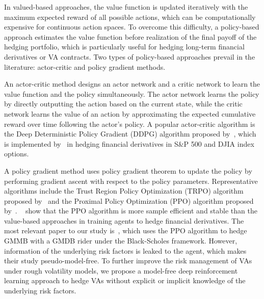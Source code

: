 In valued-based approaches, the value function is updated iteratively with the maximum expected reward of all possible actions, which can be computationally expensive for continuous action spaces.
To overcome this difficulty, a policy-based approach estimates the value function before realization of the final payoff of the hedging portfolio, which is particularly useful for hedging long-term financial derivatives or VA contracts.
Two types of policy-based approaches prevail in the literature: actor-critic and policy gradient methods.

An actor-critic method designs an actor network and a critic network to learn the value function and the policy simultaneously.
The actor network learns the policy by directly outputting the action based on the current state, while the critic network learns the value of an action by approximating the expected cumulative reward over time following the actor's policy.
A popular actor-critic algorithm is the Deep Deterministic Policy Gradient (DDPG) algorithm proposed by~\cite{lillicrap2015continuous}, which is implemented by~\cite{xu2022delta} in hedging financial derivatives in S\&P 500 and DJIA index options.

A policy gradient method uses policy gradient theorem to update the policy by performing gradient ascent with respect to the policy parameters.
Representative algorithms include the Trust Region Policy Optimization (TRPO) algorithm proposed by~\cite{schulman2015trust} and the Proximal Policy Optimization (PPO) algorithm proposed by~\cite{schulman2017proximal}.
~\cite{du2020deep} show that the PPO algorithm is more sample efficient and stable than the value-based approaches in training agents to hedge financial derivatives.
The most relevant paper to our study is~\cite{chong2023pseudo}, which uses the PPO algorithm to hedge GMMB with a GMDB rider under the Black-Scholes framework.
However, information of the underlying risk factors is leaked to the agent, which makes their study pseudo-model-free.
To further improve the risk management of VAs under rough volatility models, we propose a model-free deep reinforcement learning approach to hedge VAs without explicit or implicit knowledge of the underlying risk factors.

